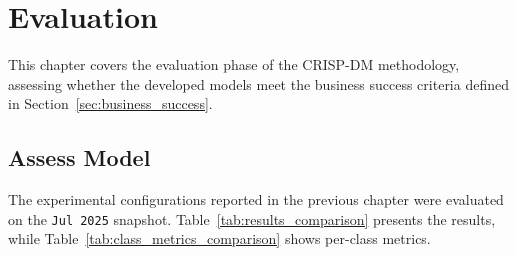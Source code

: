 

\chapter{Evaluation}

This chapter covers the evaluation phase of the CRISP-DM methodology, assessing whether the developed models meet the business success criteria defined in Section~\ref{sec:business_success}.

\section{Assess Model}

The experimental configurations reported in the previous chapter were evaluated on the \texttt{Jul 2025} snapshot. Table~\ref{tab:results_comparison} presents the results, while Table~\ref{tab:class_metrics_comparison} shows per-class metrics.

